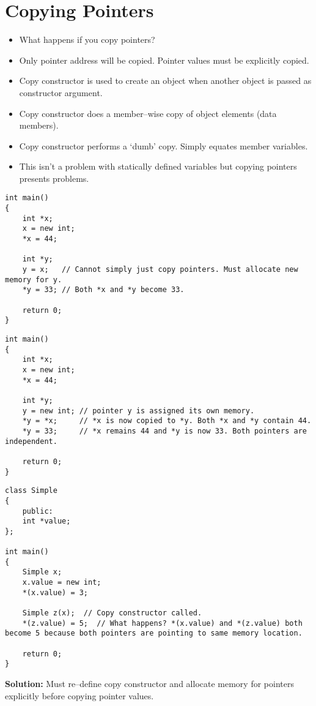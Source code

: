 \documentclass[12pt,a4paper]{article}
\begin{document}
\section{Copying Pointers}
\begin{itemize}
\item What happens if you copy pointers?
\item Only pointer address will be copied. Pointer values must be explicitly copied.
\item Copy constructor is used to create an object when another object is passed as constructor argument.
\item Copy constructor does a member--wise copy of object elements (data members).
\item Copy constructor performs a `dumb' copy. Simply equates member variables.
\item This isn't a problem with statically defined variables but copying pointers presents problems.
\end{itemize}
\begin{lstlisting}[caption={Copying Pointers}]
int main()
{
	int *x;
	x = new int;
	*x = 44;
	
	int *y;
	y = x;   // Cannot simply just copy pointers. Must allocate new memory for y.
	*y = 33; // Both *x and *y become 33.
	
	return 0;
}

\end{lstlisting}
\begin{lstlisting}[caption={Proper Way to Copy Pointers}]
int main()
{
	int *x;
	x = new int;
	*x = 44;
	
	int *y;
	y = new int; // pointer y is assigned its own memory.
	*y = *x;     // *x is now copied to *y. Both *x and *y contain 44.
	*y = 33;     // *x remains 44 and *y is now 33. Both pointers are independent.
	
	return 0;
}

\end{lstlisting}
\begin{lstlisting}[caption={Copying Pointers Using Copy Constructor}]
class Simple
{
	public:
	int *value;
};

int main()
{
	Simple x;
	x.value = new int;
	*(x.value) = 3;
	
	Simple z(x);  // Copy constructor called.
	*(z.value) = 5;  // What happens? *(x.value) and *(z.value) both become 5 because both pointers are pointing to same memory location.
	
	return 0;
}
\end{lstlisting}
\noindent\textbf{Solution:} Must re--define copy constructor and allocate memory for pointers explicitly before copying pointer values.


\end{document}
